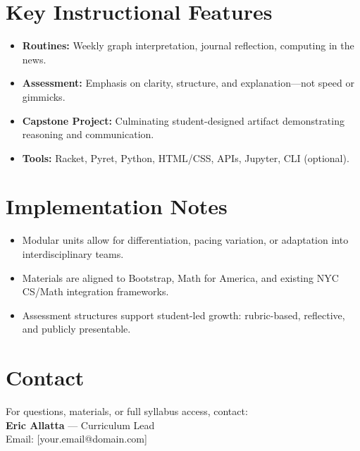 \documentclass[11pt]{article}
\begin{document}
\section*{Key Instructional Features}
\begin{itemize}[leftmargin=*]
  \item \textbf{Routines:} Weekly graph interpretation, journal reflection, computing in the news.
  \item \textbf{Assessment:} Emphasis on clarity, structure, and explanation—not speed or gimmicks.
  \item \textbf{Capstone Project:} Culminating student-designed artifact demonstrating reasoning and communication.
  \item \textbf{Tools:} Racket, Pyret, Python, HTML/CSS, APIs, Jupyter, CLI (optional).
\end{itemize}

\section*{Implementation Notes}
\begin{itemize}[leftmargin=*]
  \item Modular units allow for differentiation, pacing variation, or adaptation into interdisciplinary teams.
  \item Materials are aligned to Bootstrap, Math for America, and existing NYC CS/Math integration frameworks.
  \item Assessment structures support student-led growth: rubric-based, reflective, and publicly presentable.
\end{itemize}

\section*{Contact}
For questions, materials, or full syllabus access, contact: \\[0.25em]
\textbf{Eric Allatta} — Curriculum Lead \\ Email: [your.email@domain.com]
\end{document}
